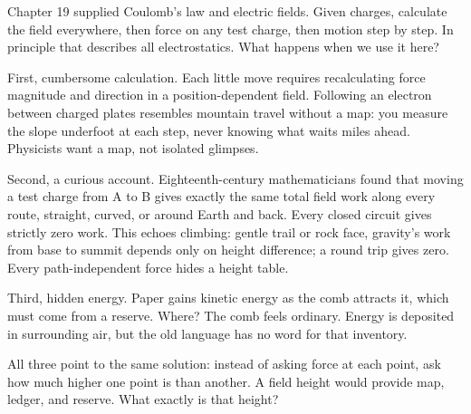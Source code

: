 
\begin{mainline}
Chapter 19 supplied Coulomb's law and electric fields. Given charges, calculate the field everywhere, then force on any test charge, then motion step by step. In principle that describes all electrostatics. What happens when we use it here?

First, cumbersome calculation. Each little move requires recalculating force magnitude and direction in a position-dependent field. Following an electron between charged plates resembles mountain travel without a map: you measure the slope underfoot at each step, never knowing what waits miles ahead. Physicists want a map, not isolated glimpses.

Second, a curious account. Eighteenth-century mathematicians found that moving a test charge from A to B gives exactly the same total field work along every route, straight, curved, or around Earth and back. Every closed circuit gives strictly zero work. This echoes climbing: gentle trail or rock face, gravity's work from base to summit depends only on height difference; a round trip gives zero. Every path-independent force hides a height table.

Third, hidden energy. Paper gains kinetic energy as the comb attracts it, which must come from a reserve. Where? The comb feels ordinary. Energy is deposited in surrounding air, but the old language has no word for that inventory.

All three point to the same solution: instead of asking force at each point, ask how much higher one point is than another. A field height would provide map, ledger, and reserve. What exactly is that height?
\end{mainline}


